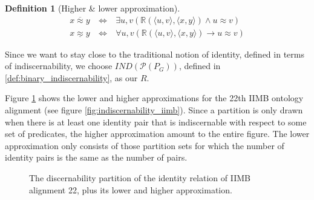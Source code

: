 \documentclass[letterpaper]{article}
\newtheorem{definition}{Definition}
\begin{document}
\begin{definition}[Higher \& lower approximation]
\begin{align}
x \overline{\approx} y \  & \iff & \ 
  \exists u,v (
      \mathbb{R}(\langle u, v \rangle, \langle x, y \rangle)
    \land
      u \approx v
  )
\label{def:higher_approximation}
\\
x \underline{\approx} y \  & \iff & \ 
  \forall u,v (
      \mathbb{R}(\langle u, v \rangle, \langle x, y \rangle)
    \rightarrow
      u \approx v
  )
\label{def:lower_approximation}
\end{align}
\end{definition}

Since we want to stay close to the traditional notion of identity, defined in terms of indiscernability, we choose $IND(\mathcal{P}(P_G))$, defined in \ref{def:binary_indiscernability}, as our $R$.

Figure \ref{fig:approximation_iimb} shows the lower and higher approximations for the 22th IIMB ontology alignment (see figure \ref{fig:indiscernability_iimb}). Since a partition is only drawn when there is at least one identity pair that is indiscernable with respect to some set of predicates, the higher approximation amount to the entire figure. The lower approximation only consists of those partition sets for which the number of identity pairs is the same as the number of pairs.

\begin{figure}
\label{fig:approximation_iimb}
\caption{The discernability partition of the identity relation of IIMB alignment 22, plus its lower and higher approximation.}
\end{figure}
\end{document}
